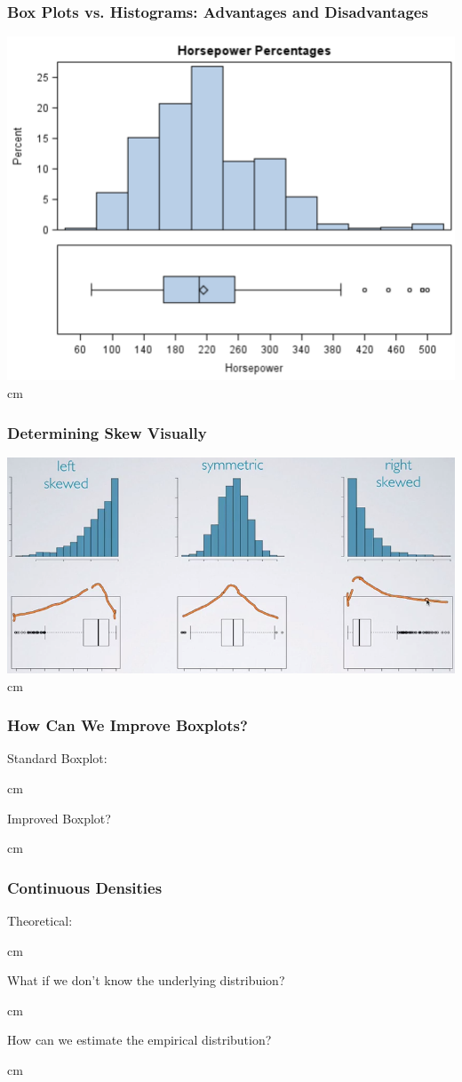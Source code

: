 \documentclass{beamer} %
\begin{document}
\begin{frame}\frametitle{Box Plots vs. Histograms:  Advantages and Disadvantages}
	\includegraphics[width=0.5\linewidth]{bp-vs-hist.png}
	 cm
\end{frame}





\begin{frame}\frametitle{Determining Skew Visually}
	\includegraphics[width=\linewidth]{skew.png}
	 cm
\end{frame}





\begin{frame}\frametitle{How Can We Improve Boxplots?}
	\small
	Standard Boxplot:
	
	 cm
	
	Improved Boxplot?  
	
	 cm
	
\end{frame}




\begin{frame}\frametitle{Continuous Densities}
	\small
	
	Theoretical:
	
	 cm
	
	
	What if we don't know the underlying distribuion?
	
	 cm
	
	How can we estimate the empirical distribution?
	
	
	 cm
	
\end{frame}
\end{document}
